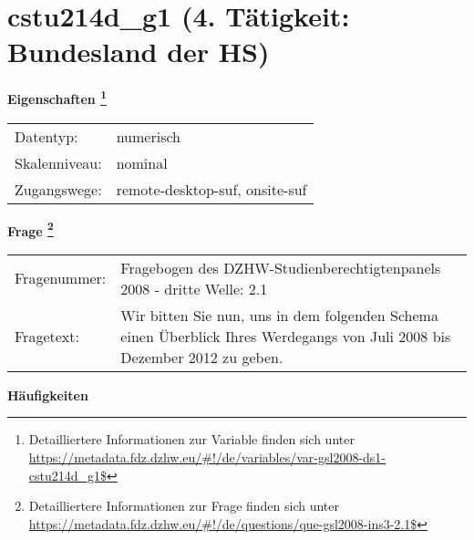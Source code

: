 
    \setcounter{footnote}{0}

    \vspace*{-1.8cm}
	\section{cstu214d\_g1 (4. Tätigkeit: Bundesland der HS)}
	\label{section:cstu214d_g1}



    \vspace*{0.5cm}
    \noindent\textbf{Eigenschaften
	\footnote{Detailliertere Informationen zur Variable finden sich unter
		\url{https://metadata.fdz.dzhw.eu/\#!/de/variables/var-gsl2008-ds1-cstu214d_g1$}}}\\
	\begin{tabularx}{\hsize}{@{}lX}
	Datentyp: & numerisch \\
	Skalenniveau: & nominal \\
	Zugangswege: &
	  remote-desktop-suf, 
	  onsite-suf
 \\
    \end{tabularx}



				\vspace*{0.5cm}
                \noindent\textbf{Frage
	                \footnote{Detailliertere Informationen zur Frage finden sich unter
		              \url{https://metadata.fdz.dzhw.eu/\#!/de/questions/que-gsl2008-ins3-2.1$}}}\\
				\begin{tabularx}{\hsize}{@{}lX}
					Fragenummer: &
					  Fragebogen des DZHW-Studienberechtigtenpanels 2008 - dritte Welle:
					  2.1
 \\
					Fragetext: & Wir bitten Sie nun, uns in dem folgenden Schema einen Überblick Ihres Werdegangs von Juli 2008 bis Dezember 2012 zu geben. \\
				\end{tabularx}





        		\vspace*{0.5cm}
                \noindent\textbf{Häufigkeiten}

